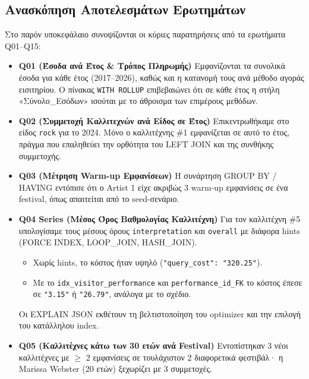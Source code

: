 \documentclass[a4paper,12pt]{article}
\begin{document}
\subsection{Ανασκόπηση Αποτελεσμάτων Ερωτημάτων}

Στο παρόν υποκεφάλαιο συνοψίζονται οι κύριες παρατηρήσεις από τα ερωτήματα Q01–Q15:

\begin{itemize}
  \item \textbf{Q01 (Έσοδα ανά Έτος \& Τρόπος Πληρωμής)}  
    Εμφανίζονται τα συνολικά έσοδα για κάθε έτος (2017–2026), καθώς και
    η κατανομή τους ανά μέθοδο αγοράς εισιτηρίου. Ο πίνακας \texttt{WITH ROLLUP}
    επιβεβαιώνει ότι σε κάθε έτος η στήλη «Σύνολο\_Εσόδων» ισούται με το άθροισμα
    των επιμέρους μεθόδων.

  \item \textbf{Q02 (Συμμετοχή Καλλιτεχνών ανά Είδος σε Έτος)}  
    Επικεντρωθήκαμε στο είδος \texttt{rock} για το 2024.  
    Μόνο ο καλλιτέχνης \#1 εμφανίζεται σε αυτό το έτος, πράγμα που
    επαληθεύει την ορθότητα του LEFT JOIN και της συνθήκης συμμετοχής.

  \item \textbf{Q03 (Μέτρηση Warm-up Εμφανίσεων)}  
    Η συνάρτηση GROUP BY / HAVING εντόπισε ότι ο Artist 1 είχε ακριβώς
    3 warm-up εμφανίσεις σε ένα festival, όπως απαιτείται από το seed-σενάριο.

  \item \textbf{Q04 Series (Μέσος Όρος Βαθμολογίας Καλλιτέχνη)}  
    Για τον καλλιτέχνη \#5 υπολογίσαμε τους μέσους όρους \texttt{interpretation} και
    \texttt{overall} με διάφορα hints (FORCE INDEX, LOOP\_JOIN, HASH\_JOIN).  
    \begin{itemize}
      \item Χωρίς hints, το κόστος ήταν υψηλό (\verb|"query_cost": "320.25"|).  
      \item Με το \texttt{idx\_visitor\_performance} και \texttt{performance\_id\_FK}
            το κόστος έπεσε σε \verb|"3.15"| ή \verb|"26.79"|, ανάλογα με το σχέδιο.
    \end{itemize}
    Οι EXPLAIN JSON εκθέτουν τη βελτιστοποίηση του optimizer και
    την επιλογή του κατάλληλου index.

  \item \textbf{Q05 (Καλλιτέχνες κάτω των 30 ετών ανά Festival)}  
     Εντοπίστηκαν 3 νέοι καλλιτέχνες με $\geq$ 2 εμφανίσεις σε τουλάχιστον 2 διαφορετικά
      φεστιβάλ· η Marissa Webster (20 ετών) ξεχωρίζει με 3 συμμετοχές.


\end{itemize}
\end{document}
